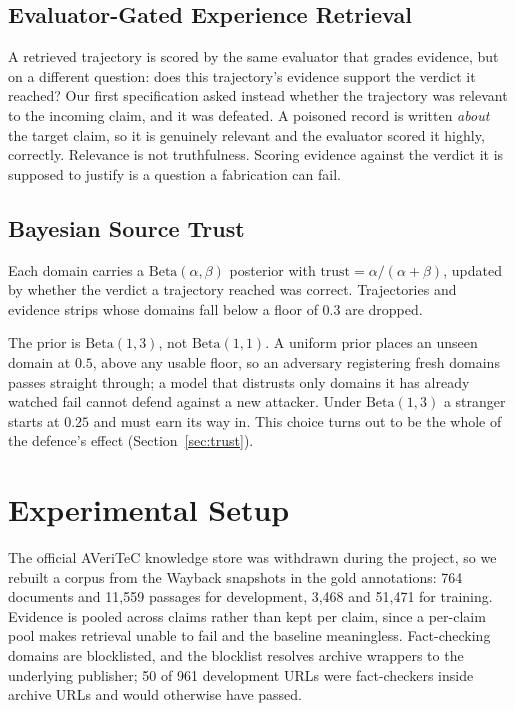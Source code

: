 \documentclass[journal]{IEEEtran}
\begin{document}
\subsection{Evaluator-Gated Experience Retrieval}
A retrieved trajectory is scored by the same evaluator that grades evidence, but
on a different question: does this trajectory's evidence support the verdict it
reached? Our first specification asked instead whether the trajectory was
relevant to the incoming claim, and it was defeated. A poisoned record is
written \emph{about} the target claim, so it is genuinely relevant and the
evaluator scored it highly, correctly. Relevance is not truthfulness. Scoring
evidence against the verdict it is supposed to justify is a question a
fabrication can fail.

\subsection{Bayesian Source Trust}
Each domain carries a $\mathrm{Beta}(\alpha,\beta)$ posterior with
$\text{trust}=\alpha/(\alpha+\beta)$, updated by whether the verdict a
trajectory reached was correct. Trajectories and evidence strips whose domains
fall below a floor of $0.3$ are dropped.

The prior is $\mathrm{Beta}(1,3)$, not $\mathrm{Beta}(1,1)$. A uniform prior
places an unseen domain at $0.5$, above any usable floor, so an adversary
registering fresh domains passes straight through; a model that distrusts only
domains it has already watched fail cannot defend against a new attacker. Under
$\mathrm{Beta}(1,3)$ a stranger starts at $0.25$ and must earn its way in. This
choice turns out to be the whole of the defence's effect
(Section~\ref{sec:trust}).

\section{Experimental Setup}
The official AVeriTeC knowledge store was withdrawn during the project, so we
rebuilt a corpus from the Wayback snapshots in the gold annotations: 764
documents and 11{,}559 passages for development, 3{,}468 and 51{,}471 for
training. Evidence is pooled across claims rather than kept per claim, since a
per-claim pool makes retrieval unable to fail and the baseline meaningless.
Fact-checking domains are blocklisted, and the blocklist resolves archive
wrappers to the underlying publisher; 50 of 961 development URLs were
fact-checkers inside archive URLs and would otherwise have passed.
\end{document}
